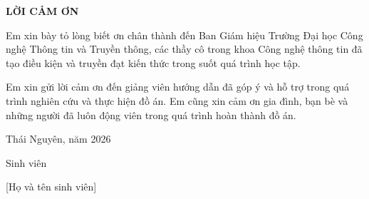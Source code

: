 \vspace*{15pt}
\begin{center}
\large{\textbf{LỜI CẢM ƠN}}
\end{center}



Em xin bày tỏ lòng biết ơn chân thành đến Ban Giám hiệu Trường Đại học Công nghệ Thông tin và Truyền thông, các thầy cô trong khoa Công nghệ thông tin đã tạo điều kiện và truyền đạt kiến thức trong suốt quá trình học tập.

Em xin gửi lời cảm ơn đến giảng viên hướng dẫn đã góp ý và hỗ trợ trong quá trình nghiên cứu và thực hiện đồ án. Em cũng xin cảm ơn gia đình, bạn bè và những người đã luôn động viên trong quá trình hoàn thành đồ án.

\vspace{1cm}

\begin{flushright}
Thái Nguyên, năm 2026

Sinh viên

\vspace{2cm}

[Họ và tên sinh viên]
\end{flushright}
